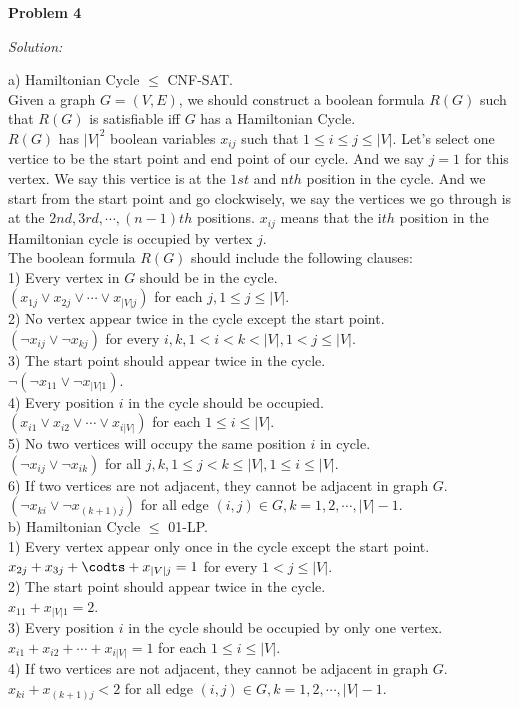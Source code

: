 \documentclass[12pt,letterpaper]{article}
\def\pp{\par\noindent}
\newcommand{\problem}[1]{ \bigskip \pp \textbf{Problem #1}\par}
\newcommand{\solution}{\textit{Solution:}\par}
\begin{document}
\problem{4}
\solution
a) Hamiltonian Cycle $\le$ CNF-SAT. \\
Given a graph $G=(V,E)$, we should construct a boolean formula $R(G)$ such that $R(G)$ is satisfiable iff $G$ has a Hamiltonian Cycle. \\
$R(G)$ has $|V|^2$ boolean variables $x_{ij}$ such that $1 \le i \le j \le |V|$.
Let's select one vertice to be the start point and end point of our cycle.
And we say $j=1$ for this vertex.
We say this vertice is at the $1st$ and n$th$ position in the cycle.
And we start from the start point and go clockwisely,
we say the vertices we go through is at the $2nd,3rd,\cdots,(n-1)th$ positions.
$x_{ij}$ means that the i$th$ position in the Hamiltonian cycle is occupied by vertex $j$. \\
The boolean formula $R(G)$ should include the following clauses: \\
1) Every vertex in $G$ should be in the cycle. \\
$(x_{1j} \vee x_{2j} \vee \cdots \vee x_{|V|j})$ for each $j, 1 \le j \le |V|$. \\
2) No vertex appear twice in the cycle except the start point. \\
$(\neg x_{ij} \vee \neg x_{kj})$ for every $i,k, 1 < i < k <|V|, 1 < j \le |V|$. \\
3) The start point should appear twice in the cycle. \\
$\neg(\neg x_{11} \vee \neg x_{|V|1})$. \\
4) Every position $i$ in the cycle should be occupied. \\
$(x_{i1} \vee x_{i2} \vee \cdots \vee x_{i|V|})$ for each $1 \le i \le |V|$. \\
5) No two vertices will occupy the same position $i$ in cycle. \\
$(\neg x_{ij} \vee \neg x_{ik})$ for all $j,k, 1 \le j < k \le |V|, 1 \le i \le |V|$. \\
6) If two vertices are not adjacent, they cannot be adjacent in graph $G$. \\
$(\neg x_{ki} \vee \neg x_{(k+1)j})$ for all edge $(i,j) \in G, k = 1,2,\cdots,|V|-1$. \\
b) Hamiltonian Cycle $\le$ 01-LP. \\
1) Every vertex appear only once in the cycle except the start point. \\
$x_{2j} + x_{3j} + \codts + x_{|V|j} = 1$ for every $1 < j \le |V|$. \\
2) The start point should appear twice in the cycle. \\
$x_{11} + x_{|V|1} = 2$. \\
3) Every position $i$ in the cycle should be occupied by only one vertex. \\
$x_{i1} + x_{i2} + \cdots + x_{i|V|} = 1$ for each $1 \le i \le |V|$. \\
4) If two vertices are not adjacent, they cannot be adjacent in graph $G$. \\
$x_{ki} + x_{(k+1)j} < 2$ for all edge $(i,j) \in G, k = 1,2,\cdots,|V|-1$. \\
\end{document}
